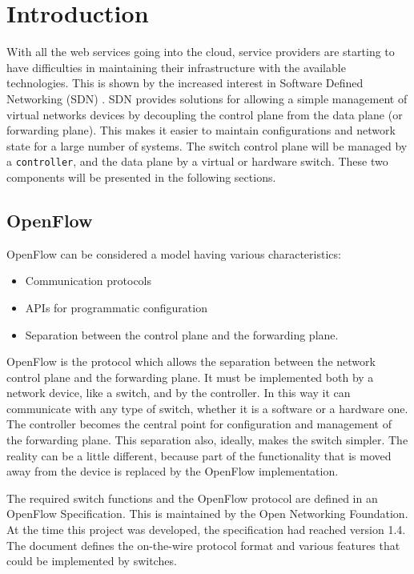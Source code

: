 \chapter{Introduction}
\label{chapter:intro}

With all the web services going into the cloud\cite{gartner}, service providers are starting to
have difficulties in maintaining their infrastructure with the available technologies.
This is shown by the increased interest in Software Defined Networking (SDN) \cite{sdn:whitepapers}.
SDN provides solutions for allowing a simple management of virtual networks devices by decoupling the control
plane from the data plane (or forwarding plane). This makes it easier to maintain configurations and network state
for a large number of systems. The switch control plane will be managed by a \texttt{controller},
and the data plane by a virtual or hardware switch. These two components will be presented in the following
sections.

\section{OpenFlow}

OpenFlow can be considered a model\cite{sdn} having various characteristics:
\begin{itemize}
 \item Communication protocols
 \item APIs for programmatic configuration
 \item Separation between the control plane and the forwarding plane.
\end{itemize}

OpenFlow is the protocol which allows the separation between the network control plane and the forwarding plane.
It must be implemented both by a network device, like a switch, and by the controller. In this way it 
can communicate with any type of switch, whether it is a software or a hardware one. The controller becomes
the central point for configuration and management of the forwarding plane. This separation also, ideally, makes the
switch simpler. The reality can be a little different, because part of the functionality that is moved away from
the device is replaced by the OpenFlow implementation.

The required switch functions and the OpenFlow protocol are defined in an OpenFlow Specification.
This is maintained by the Open Networking Foundation\cite{onf}. At the time this project was developed, the specification
had reached version 1.4. The document defines the on-the-wire protocol format and various features that could
be implemented by switches.

